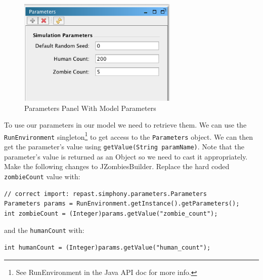 \documentclass[11pt]{amsart}
\begin{document}
\begin{figure}[h]
\begin{center}
\vspace{.2in}
\centerline {
\includegraphics[width=3in]{GettingStartedImages/params2.png}
}
\caption{Parameters Panel With Model Parameters}
\label{fig:params2}
\end{center}
\end{figure}

To use our parameters in our model we need to retrieve them. We can use the \texttt{RunEnvironment} singleton\footnote{See RunEnvironment in the Java API doc for more info.} to get access to the \texttt{Parameters} object. We can then get the parameter's value using \texttt{getValue(String paramName)}. Note that the parameter's value is returned as an Object so we need to cast it appropriately. Make the following changes to JZombiesBuilder.  Replace the hard coded \texttt{zombieCount} value with:

\noindent\begin{minipage}[h]{\textwidth}
\vspace{.2in}
\lstset{language=java,caption=}
\begin{lstlisting}
// correct import: repast.simphony.parameters.Parameters
Parameters params = RunEnvironment.getInstance().getParameters();
int zombieCount = (Integer)params.getValue("zombie_count");
\end{lstlisting}
\vspace{.2in}
\end{minipage}

and the \texttt{humanCount} with:

\noindent\begin{minipage}[h]{\textwidth}
\vspace{.2in}
\lstset{language=java,caption=}
\begin{lstlisting}
int humanCount = (Integer)params.getValue("human_count");
\end{lstlisting}

\end{minipage}
\end{document}
